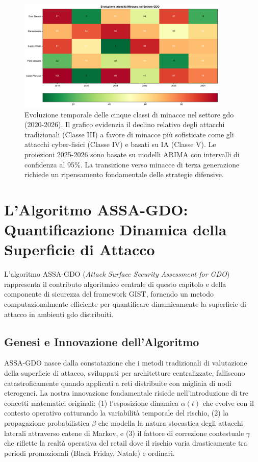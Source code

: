 \begin{figure}[htbp]
\centering
\includegraphics[width=0.9\textwidth]{thesis_figures/cap2/fig_threat_evolution.pdf}
\caption[Evoluzione temporale delle cinque classi di minacce nel settore GDO]{Evoluzione temporale delle cinque classi di minacce nel settore \gls{gdo} (2020-2026). Il grafico evidenzia il declino relativo degli attacchi tradizionali (Classe III) a favore di minacce più sofisticate come gli attacchi cyber-fisici (Classe IV) e basati su IA (Classe V). Le proiezioni 2025-2026 sono basate su modelli ARIMA con intervalli di confidenza al 95\%. La transizione verso minacce di terza generazione richiede un ripensamento fondamentale delle strategie difensive.}
\label{fig:tassonomia_minacce}
\end{figure}

\section{\texorpdfstring{L'Algoritmo ASSA-GDO: Quantificazione Dinamica della Superficie di Attacco}{2.4 - L'Algoritmo ASSA-GDO: Quantificazione Dinamica della Superficie di Attacco}}
\label{sec:algoritmo_assa}

L'algoritmo ASSA-GDO (\textit{Attack Surface Security Assessment for GDO}) rappresenta il contributo algoritmico centrale di questo capitolo e della componente di sicurezza del framework GIST, fornendo un metodo computazionalmente efficiente per quantificare dinamicamente la superficie di attacco in ambienti \gls{gdo} distribuiti.

\subsection{\texorpdfstring{Genesi e Innovazione dell'Algoritmo}{2.4.1 - Genesi e Innovazione dell'Algoritmo}}

ASSA-GDO nasce dalla constatazione che i metodi tradizionali di valutazione della superficie di attacco, sviluppati per architetture centralizzate, falliscono catastroficamente quando applicati a reti distribuite con migliaia di nodi eterogenei. La nostra innovazione fondamentale risiede nell'introduzione di tre concetti matematici originali: (1) l'esposizione dinamica $\alpha(t)$ che evolve con il contesto operativo catturando la variabilità temporale del rischio, (2) la propagazione probabilistica $\beta$ che modella la natura stocastica degli attacchi laterali attraverso catene di Markov, e (3) il fattore di correzione contestuale $\gamma$ che riflette la realtà operativa del retail dove il rischio varia drasticamente tra periodi promozionali (Black Friday, Natale) e ordinari.

